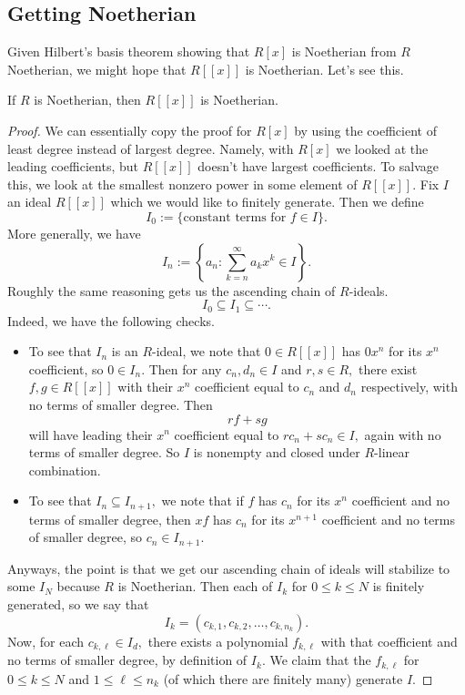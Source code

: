 \subsection{Getting Noetherian}
Given Hilbert's basis theorem showing that $R[x]$ is Noetherian from $R$ Noetherian, we might hope that $R[[x]]$ is Noetherian. Let's see this.
\begin{theorem}
	If $R$ is Noetherian, then $R[[x]]$ is Noetherian.
\end{theorem}
\begin{proof}
	We can essentially copy the proof for $R[x]$ by using the coefficient of least degree instead of largest degree. Namely, with $R[x]$ we looked at the leading coefficients, but $R[[x]]$ doesn't have largest coefficients. To salvage this, we look at the smallest nonzero power in some element of $R[[x]].$ Fix $I$ an ideal $R[[x]]$ which we would like to finitely generate. Then we define
	\[I_0:=\{\text{constant terms for }f\in I\}.\]
	More generally, we have
	\[I_n:=\left\{a_n:\sum_{k=n}^\infty a_kx^k\in I\right\}.\]
	Roughly the same reasoning gets us the ascending chain of $R$-ideals.
	\[I_0\subseteq I_1\subseteq\cdots.\]
	Indeed, we have the following checks.
	\begin{itemize}
		\item To see that $I_n$ is an $R$-ideal, we note that $0\in R[[x]]$ has $0x^n$ for its $x^n$ coefficient, so $0\in I_n.$ Then for any $c_n,d_n\in I$ and $r,s\in R,$ there exist $f,g\in R[[x]]$ with their $x^n$ coefficient equal to $c_n$ and $d_n$ respectively, with no terms of smaller degree. Then
		\[rf+sg\]
		will have leading their $x^n$ coefficient equal to $rc_n+sc_n\in I,$ again with no terms of smaller degree. So $I$ is nonempty and closed under $R$-linear combination.
		\item To see that $I_n\subseteq I_{n+1},$ we note that if $f$ has $c_n$ for its $x^n$ coefficient and no terms of smaller degree, then $xf$ has $c_n$ for its $x^{n+1}$ coefficient and no terms of smaller degree, so $c_n\in I_{n+1}.$
	\end{itemize}
	Anyways, the point is that we get our ascending chain of ideals will stabilize to some $I_N$ because $R$ is Noetherian. Then each of $I_k$ for $0\le k\le N$ is finitely generated, so we say that
	\[I_k=(c_{k,1},c_{k,2},\ldots,c_{k,n_k}).\]
	Now, for each $c_{k,\ell}\in I_d,$ there exists a polynomial $f_{k,\ell}$ with that coefficient and no terms of smaller degree, by definition of $I_k.$ We claim that the $f_{k,\ell}$ for $0\le k\le N$ and $1\le\ell\le n_k$ (of which there are finitely many) generate $I.$


\end{proof}
